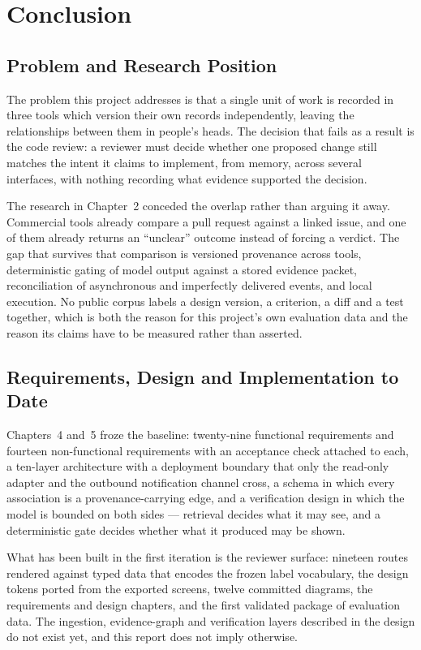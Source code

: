 \chapter{Conclusion}
\label{ch:conclusion}

\section{Problem and Research Position}

The problem this project addresses is that a single unit of work is recorded in
three tools which version their own records independently, leaving the
relationships between them in people's heads. The decision that fails as a
result is the code review: a reviewer must decide whether one proposed change
still matches the intent it claims to implement, from memory, across several
interfaces, with nothing recording what evidence supported the decision.

The research in Chapter~2 conceded the overlap rather than arguing it away.
Commercial tools already compare a pull request against a linked issue, and one
of them already returns an ``unclear'' outcome instead of forcing a verdict. The
gap that survives that comparison is versioned provenance across tools,
deterministic gating of model output against a stored evidence packet,
reconciliation of asynchronous and imperfectly delivered events, and local
execution. No public corpus labels a design version, a criterion, a diff and a
test together, which is both the reason for this project's own evaluation data
and the reason its claims have to be measured rather than asserted.

\section{Requirements, Design and Implementation to Date}

Chapters~4 and~5 froze the baseline: twenty-nine functional requirements and
fourteen non-functional requirements with an acceptance check attached to each,
a ten-layer architecture with a deployment boundary that only the read-only
adapter and the outbound notification channel cross, a schema in which every
association is a provenance-carrying edge, and a verification design in which
the model is bounded on both sides --- retrieval decides what it may see, and a
deterministic gate decides whether what it produced may be shown.

What has been built in the first iteration is the reviewer surface: nineteen
routes rendered against typed data that encodes the frozen label vocabulary, the
design tokens ported from the exported screens, twelve committed diagrams, the
requirements and design chapters, and the first validated package of evaluation
data. The ingestion, evidence-graph and verification layers described in the
design do not exist yet, and this report does not imply otherwise.

